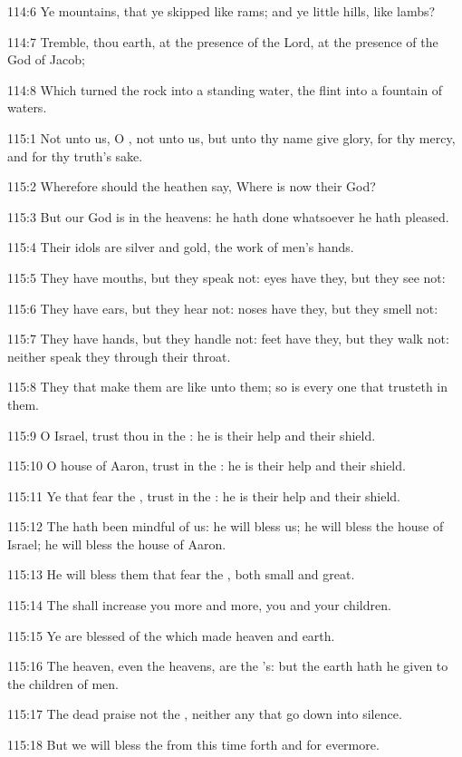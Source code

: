 114:6 Ye mountains, that ye skipped like rams; and ye little hills, like lambs?

114:7 Tremble, thou earth, at the presence of the Lord, at the presence of the God of Jacob;

114:8 Which turned the rock into a standing water, the flint into a fountain of waters.



115:1 Not unto us, O \LORD, not unto us, but unto thy name give glory, for thy mercy, and for thy truth's sake.

115:2 Wherefore should the heathen say, Where is now their God?

115:3 But our God is in the heavens: he hath done whatsoever he hath pleased.

115:4 Their idols are silver and gold, the work of men's hands.

115:5 They have mouths, but they speak not: eyes have they, but they see not:

115:6 They have ears, but they hear not: noses have they, but they smell not:

115:7 They have hands, but they handle not: feet have they, but they walk not: neither speak they through their throat.

115:8 They that make them are like unto them; so is every one that trusteth in them.

115:9 O Israel, trust thou in the \LORD: he is their help and their shield.

115:10 O house of Aaron, trust in the \LORD: he is their help and their shield.

115:11 Ye that fear the \LORD, trust in the \LORD: he is their help and their shield.

115:12 The \LORD hath been mindful of us: he will bless us; he will bless the house of Israel; he will bless the house of Aaron.

115:13 He will bless them that fear the \LORD, both small and great.

115:14 The \LORD shall increase you more and more, you and your children.

115:15 Ye are blessed of the \LORD which made heaven and earth.

115:16 The heaven, even the heavens, are the \LORD's: but the earth hath he given to the children of men.

115:17 The dead praise not the \LORD, neither any that go down into silence.

115:18 But we will bless the \LORD from this time forth and for evermore.

